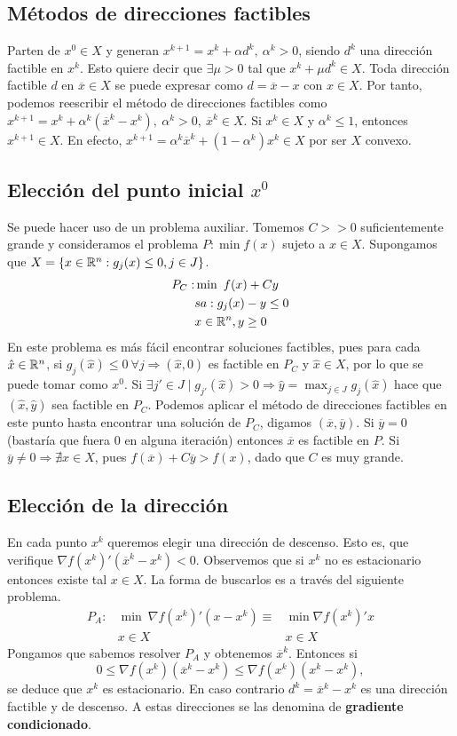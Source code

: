 \documentclass[MIOP.tex]{subfiles}
\begin{document}
\subsection{Métodos de direcciones factibles}
Parten de $x^0\in X$ y generan $x^{k+1}=x^k+\alpha d^k,\ \alpha^k>0$, siendo $d^k$ una dirección factible en $x^k$. Esto quiere decir que $\exists\mu >0$ tal que $x^{k}+\mu d^k\in X$. Toda dirección factible $d$ en $\overline{x}\in X$ se puede expresar como $d=\overline{x}-x$ con $x\in X$. Por tanto, podemos reescribir el método de direcciones factibles como $x^{k+1}=x^k+\alpha^k(\overline{x}^k-x^k),\ \alpha^k>0,\ \overline{x}^k\in X$. Si $x^k\in X$ y $\alpha^k\leq 1$, entonces $x^{k+1}\in X$. En efecto, $x^{k+1}=\alpha^k\overline{x}^k+(1-\alpha^k)x^k\in X$ por ser $X$ convexo. 

\subsection{Elección del punto inicial $x^0$}
Se puede hacer uso de un problema auxiliar. Tomemos $C>>0$ suficientemente grande y consideramos el problema $P:\min f(x)$ sujeto a $x\in X$. Supongamos que $X=\{x\in\mathbb{R}^n: g_j(x)\leq 0, j\in J\}$. 
\begin{align*}
P_C:&\min\ f(x)+Cy\\
 & sa:g_j(x)-y\leq 0\\
 & x\in\mathbb{R}^n, y\geq 0
\end{align*}
En este problema es más fácil encontrar soluciones factibles, pues para cada $\hat{x}\in\mathbb{R}^n$, si $g_j(\hat{x})\leq 0\ \forall j\Rightarrow (\hat{x},0)$ es factible en $P_C$ y $\hat{x}\in X$, por lo que se puede tomar como $x^0$. Si $\exists j'\in J \mid g_{j'}(\hat{x})>0\Rightarrow \hat{y}=\max_{j\in J} g_j(\hat{x})$ hace que $(\hat{x},\hat{y})$ sea factible en $P_C$. Podemos aplicar el método de direcciones factibles en este punto hasta encontrar una solución de $P_C$, digamos $(\overline{x},\overline{y})$. Si $\overline{y}=0$ (bastaría que fuera 0 en alguna iteración) entonces $\overline{x}$ es factible en $P$. Si $\overline{y}\neq 0\Rightarrow\nexists x\in X$, pues $f(\overline{x})+C\overline{y}>f(x)$, dado que $C$ es muy grande.

\subsection{Elección de la dirección}
En cada punto $x^k$ queremos elegir una dirección de descenso. Esto es, que verifique $\nabla f(x^k)'(\overline{x}^k-x^k)<0$. Observemos que si $x^k$ no es estacionario entonces existe tal $x\in X$. La forma de buscarlos es a través del siguiente problema. 
\begin{align*}
P_A: &\min\ \nabla f(x^k)'(x-x^k) \equiv & \min \nabla f(x^k)'x\\
 & x\in X								& x\in X
\end{align*}
Pongamos que sabemos resolver $P_A$ y obtenemos $\overline{x}^k$. Entonces si $$0\leq\nabla f(x^k)(\overline{x}^k-x^k)\leq \nabla  f(x^k)(x^k-x^k),$$ se deduce que $x^k$ es estacionario. En caso contrario $d^k=\overline{x}^k-x^k$ es una dirección factible y de descenso. A estas direcciones se las denomina de \textbf{gradiente condicionado}.
\end{document}
